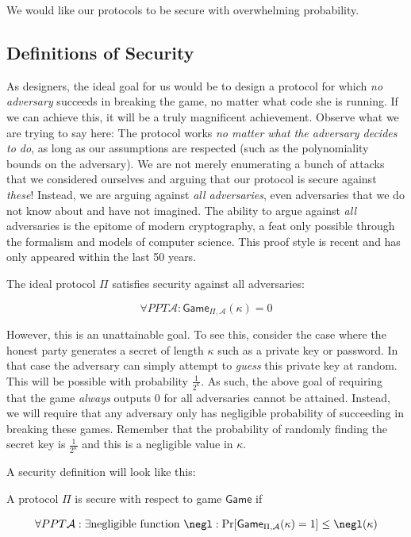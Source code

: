 We would like our protocols to be secure with overwhelming probability.

\subsection*{Definitions of Security}

As designers, the ideal goal for us would be to design a protocol for which \emph{no adversary}
succeeds in breaking the game, no matter what code she is running. If we can achieve this, it
will be a truly magnificent achievement. Observe what we are trying to say here: The protocol
works \emph{no matter what the adversary decides to do}, as long as our assumptions are respected
(such as the polynomiality bounds on the adversary).
We are not merely enumerating a bunch of attacks that we considered ourselves and arguing that
our protocol is secure against \emph{these}!
Instead, we are arguing against \emph{all adversaries}, even adversaries that we do
not know about and have not imagined. The ability to argue against \emph{all} adversaries is the
epitome of modern cryptography, a feat only possible through the
formalism and models of computer science. This proof style is recent and has only appeared within
the last 50 years.

The ideal protocol $\Pi$ satisfies security against all adversaries:

\[
  \forall PPT \mathcal{A}: \textsf{Game}_{\Pi,\mathcal{A}}(\kappa) = 0
\]

However, this is an unattainable goal. To see this, consider the case where the honest party
generates a secret of length $\kappa$ such as a private key or password. In that case the
adversary can simply attempt to \emph{guess} this private key at random. This will be possible
with probability $\frac{1}{2^\kappa}$. As such, the above goal of requiring that the game
\emph{always} outputs $0$ for all adversaries cannot be attained. Instead, we will require
that any adversary only has negligible probability of succeeding in breaking these games.
Remember that the probability of randomly finding the secret key is $\frac{1}{2^\kappa}$
and this is a negligible value in $\kappa$.

A security definition will look like this:

\begin{definition}[Security]
  A protocol $\Pi$ is secure with respect to game $\textsf{Game}$ if

  \[
    \forall PPT \mathcal{A}: \exists \text{negligible function } \negl:
    \Pr[\textsf{Game}_{\Pi,\mathcal{A}}(\kappa) = 1] \leq \negl(\kappa)
  \]
\end{definition}

